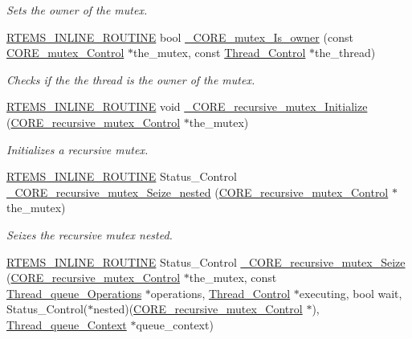 \begin{DoxyCompactItemize}
\begin{DoxyCompactList}\small\item\em Sets the owner of the mutex. \end{DoxyCompactList}\item 
\mbox{\hyperlink{group__RTEMSScoreBaseDefs_gac216239df231d5dbd15e3520b0b9313f}{R\+T\+E\+M\+S\+\_\+\+I\+N\+L\+I\+N\+E\+\_\+\+R\+O\+U\+T\+I\+NE}} bool \mbox{\hyperlink{group__RTEMSScoreMutex_gabe046b730388df1b060c700dc17a142d}{\+\_\+\+C\+O\+R\+E\+\_\+mutex\+\_\+\+Is\+\_\+owner}} (const \mbox{\hyperlink{structCORE__mutex__Control}{C\+O\+R\+E\+\_\+mutex\+\_\+\+Control}} $\ast$the\+\_\+mutex, const \mbox{\hyperlink{struct__Thread__Control}{Thread\+\_\+\+Control}} $\ast$the\+\_\+thread)
\begin{DoxyCompactList}\small\item\em Checks if the the thread is the owner of the mutex. \end{DoxyCompactList}\item 
\mbox{\hyperlink{group__RTEMSScoreBaseDefs_gac216239df231d5dbd15e3520b0b9313f}{R\+T\+E\+M\+S\+\_\+\+I\+N\+L\+I\+N\+E\+\_\+\+R\+O\+U\+T\+I\+NE}} void \mbox{\hyperlink{group__RTEMSScoreMutex_ga479a63bb7147291650bd7d69c24dc3fd}{\+\_\+\+C\+O\+R\+E\+\_\+recursive\+\_\+mutex\+\_\+\+Initialize}} (\mbox{\hyperlink{structCORE__recursive__mutex__Control}{C\+O\+R\+E\+\_\+recursive\+\_\+mutex\+\_\+\+Control}} $\ast$the\+\_\+mutex)
\begin{DoxyCompactList}\small\item\em Initializes a recursive mutex. \end{DoxyCompactList}\item 
\mbox{\hyperlink{group__RTEMSScoreBaseDefs_gac216239df231d5dbd15e3520b0b9313f}{R\+T\+E\+M\+S\+\_\+\+I\+N\+L\+I\+N\+E\+\_\+\+R\+O\+U\+T\+I\+NE}} Status\+\_\+\+Control \mbox{\hyperlink{group__RTEMSScoreMutex_ga683ddf1a8f11e05a5c97af56d1dfe856}{\+\_\+\+C\+O\+R\+E\+\_\+recursive\+\_\+mutex\+\_\+\+Seize\+\_\+nested}} (\mbox{\hyperlink{structCORE__recursive__mutex__Control}{C\+O\+R\+E\+\_\+recursive\+\_\+mutex\+\_\+\+Control}} $\ast$the\+\_\+mutex)
\begin{DoxyCompactList}\small\item\em Seizes the recursive mutex nested. \end{DoxyCompactList}\item 
\mbox{\hyperlink{group__RTEMSScoreBaseDefs_gac216239df231d5dbd15e3520b0b9313f}{R\+T\+E\+M\+S\+\_\+\+I\+N\+L\+I\+N\+E\+\_\+\+R\+O\+U\+T\+I\+NE}} Status\+\_\+\+Control \mbox{\hyperlink{group__RTEMSScoreMutex_gaacb95bc0bdba9fb365d01dfe2623665d}{\+\_\+\+C\+O\+R\+E\+\_\+recursive\+\_\+mutex\+\_\+\+Seize}} (\mbox{\hyperlink{structCORE__recursive__mutex__Control}{C\+O\+R\+E\+\_\+recursive\+\_\+mutex\+\_\+\+Control}} $\ast$the\+\_\+mutex, const \mbox{\hyperlink{structThread__queue__Operations}{Thread\+\_\+queue\+\_\+\+Operations}} $\ast$operations, \mbox{\hyperlink{struct__Thread__Control}{Thread\+\_\+\+Control}} $\ast$executing, bool wait, Status\+\_\+\+Control($\ast$nested)(\mbox{\hyperlink{structCORE__recursive__mutex__Control}{C\+O\+R\+E\+\_\+recursive\+\_\+mutex\+\_\+\+Control}} $\ast$), \mbox{\hyperlink{structThread__queue__Context}{Thread\+\_\+queue\+\_\+\+Context}} $\ast$queue\+\_\+context)

\end{DoxyCompactItemize}
